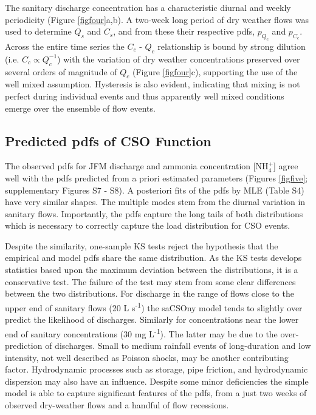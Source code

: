 \documentclass[draft,linenumbers]{agujournal2018}
\begin{document}
The sanitary discharge concentration has a characteristic diurnal and weekly periodicity (Figure \ref{figfour}a,b). A two-week long period of dry weather f\/lows was used to determine $Q_s$ and $C_s$, and from these their respective pdfs, $p_{Q_c}$ and $p_{C_c}$.  Across the entire time series the $C_c$ - $Q_c$ relationship is bound by strong dilution (i.e. $C_c \propto Q_c^{-1}$) with the variation of dry weather concentrations preserved over several orders of magnitude of $Q_c$ (Figure \ref{figfour}c), supporting the use of the well mixed assumption. Hysteresis is also evident, indicating that mixing is not perfect during individual events and thus apparently well mixed conditions emerge over the ensemble of flow events.

\subsection{Predicted pdfs of CSO Function}
The observed pdfs for JFM discharge and ammonia concentration [NH$_4^+$] agree well with the pdfs predicted from a priori estimated parameters (Figures \ref{figfive}; supplementary Figures S7 - S8). A posteriori fits of the pdfs by MLE (Table S4) have very similar shapes. The multiple modes stem from the diurnal variation in sanitary f\/lows. Importantly, the pdfs capture the long tails of both distributions which is necessary to correctly capture the load distribution for CSO events. 
 
Despite the similarity, one-sample KS tests reject the hypothesis that the empirical and model pdfs share the same distribution. As the KS tests develops statistics based upon the maximum deviation between the distributions, it is a conservative test. The failure of the test may stem from some clear dif\/ferences between the two distributions. For discharge in the range of f\/lows close to the upper end of sanitary f\/lows (20 L s\textsuperscript{-1}) the saCSOny model tends to slightly over predict the likelihood of discharges. Similarly for concentrations near the lower end of sanitary concentrations (30 mg L\textsuperscript{-1}). The latter may be due to the over-prediction of discharges. Small to medium rainfall events of long-duration and low intensity, not well described as Poisson shocks, may be another contributing factor. Hydrodynamic processes such as storage, pipe friction, and hydrodynamic dispersion may also have an inf\/luence. Despite some minor def\/iciencies the simple model is able to capture signif\/icant features of the pdfs, from a just two weeks of observed dry-weather f\/lows and a handful of f\/low recessions.
 
\end{document}
